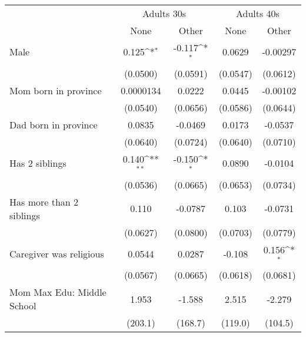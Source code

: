 {
\def\sym#1{\ifmmode^{#1}\else\(^{#1}\)\fi}
\begin{tabular}{l*{4}{c}}
\toprule
					& \multicolumn{2}{c}{Adults 30s} & \multicolumn{2}{c}{Adults 40s} \\
                    &\multicolumn{1}{c}{None}&\multicolumn{1}{c}{Other}&\multicolumn{1}{c}{None}&\multicolumn{1}{c}{Other}\\
\midrule
Male                &       0.125\sym{*}  &      -0.117\sym{*}  &      0.0629         &    -0.00297         \\
                    &    (0.0500)         &    (0.0591)         &    (0.0547)         &    (0.0612)         \\
\addlinespace
Mom born in province&   0.0000134         &      0.0222         &      0.0445         &    -0.00102         \\
                    &    (0.0540)         &    (0.0656)         &    (0.0586)         &    (0.0644)         \\
\addlinespace
Dad born in province&      0.0835         &     -0.0469         &      0.0173         &     -0.0537         \\
                    &    (0.0640)         &    (0.0724)         &    (0.0640)         &    (0.0710)         \\
\addlinespace
Has 2 siblings      &       0.140\sym{**} &      -0.150\sym{*}  &      0.0890         &     -0.0104         \\
                    &    (0.0536)         &    (0.0665)         &    (0.0653)         &    (0.0734)         \\
\addlinespace
Has more than 2 siblings&       0.110         &     -0.0787         &       0.103         &     -0.0731         \\
                    &    (0.0627)         &    (0.0800)         &    (0.0703)         &    (0.0779)         \\
\addlinespace
Caregiver was religious&      0.0544         &      0.0287         &      -0.108         &       0.156\sym{*}  \\
                    &    (0.0567)         &    (0.0665)         &    (0.0618)         &    (0.0681)         \\
\addlinespace
Mom Max Edu: Middle School&       1.953         &      -1.588         &       2.515         &      -2.279         \\
                    &     (203.1)         &     (168.7)         &     (119.0)         &     (104.5)         \\

\end{tabular}}
